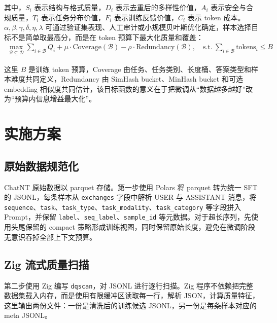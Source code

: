\documentclass{article}
\begin{document}
其中，$S_i$ 表示结构与格式质量，$D_i$ 表示去重后的多样性价值，$A_i$ 表示安全与合规质量，$T_i$ 表示任务分布价值，$F_i$ 表示训练反馈价值，$C_i$ 表示 token 成本。$\alpha,\beta,\gamma,\delta,\eta,\lambda$ 可通过验证集表现、人工审计或小规模贝叶斯优化确定，样本选择目标不是简单取最高分，而是在 token 预算下最大化质量和覆盖：
\begin{align}
    \max_{\mathcal{B}\subseteq\mathcal{D}}
    \sum_{i\in\mathcal{B}}Q_i
    + \mu\cdot\mathrm{Coverage}(\mathcal{B})
    - \rho\cdot\mathrm{Redundancy}(\mathcal{B}),
    \quad
    \mathrm{s.t.}\ \sum_{i\in\mathcal{B}}\mathrm{tokens}_i \leqslant B
\end{align}

这里 $B$ 是训练 token 预算，Coverage 由任务、任务类别、长度桶、答案类型和样本难度共同定义，Redundancy 由 SimHash bucket、MinHash bucket 和可选 embedding 相似度共同估计，该目标函数的意义在于把微调从“数据越多越好”改为“预算内信息增益最大化”。



\section{实施方案}
\subsection{原始数据规范化}
ChatNT 原始数据以 parquet 存储。第一步使用 Polars 将 parquet 转为统一 SFT 的 JSONL，每条样本从 \texttt{exchanges} 字段中解析 USER 与 ASSISTANT 消息，将 \texttt{sequence}、\texttt{task}、\texttt{task\_type}、\texttt{task\_modality}、\texttt{task\_category} 等字段拼入 Prompt，并保留 \texttt{label}、\texttt{seq\_label}、\texttt{sample\_id} 等元数据。对于超长序列，先使用头尾保留的 compact 策略形成训练视图，同时保留原始长度，避免在微调阶段无意识吞掉全部上下文预算。



\subsection{Zig 流式质量扫描}
第二步使用 Zig 编写 \texttt{dqscan}，对 JSONL 进行逐行扫描。Zig 程序不依赖把完整数据集载入内存，而是使用有限缓冲区读取每一行，解析 JSON，计算质量特征，这里输出两份文件：一份是清洗后的训练候选 JSONL，另一份是每条样本对应的 meta JSONL。
\end{document}
